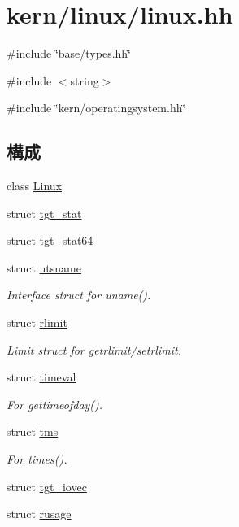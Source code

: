 \hypertarget{kern_2linux_2linux_8hh}{
\section{kern/linux/linux.hh}
\label{kern_2linux_2linux_8hh}
}
{\ttfamily \#include \char`\"{}base/types.hh\char`\"{}}\par
{\ttfamily \#include $<$string$>$}\par
{\ttfamily \#include \char`\"{}kern/operatingsystem.hh\char`\"{}}\par
\subsection*{構成}
\begin{DoxyCompactItemize}
\item 
class \hyperlink{classLinux}{Linux}
\item 
struct \hyperlink{structLinux_1_1tgt__stat}{tgt\_\-stat}
\item 
struct \hyperlink{structLinux_1_1tgt__stat64}{tgt\_\-stat64}
\item 
struct \hyperlink{structLinux_1_1utsname}{utsname}
\begin{DoxyCompactList}\small\item\em Interface struct for uname(). \item\end{DoxyCompactList}\item 
struct \hyperlink{structLinux_1_1rlimit}{rlimit}
\begin{DoxyCompactList}\small\item\em Limit struct for getrlimit/setrlimit. \item\end{DoxyCompactList}\item 
struct \hyperlink{structLinux_1_1timeval}{timeval}
\begin{DoxyCompactList}\small\item\em For gettimeofday(). \item\end{DoxyCompactList}\item 
struct \hyperlink{structLinux_1_1tms}{tms}
\begin{DoxyCompactList}\small\item\em For times(). \item\end{DoxyCompactList}\item 
struct \hyperlink{structLinux_1_1tgt__iovec}{tgt\_\-iovec}
\item 
struct \hyperlink{structLinux_1_1rusage}{rusage}
\end{DoxyCompactItemize}
